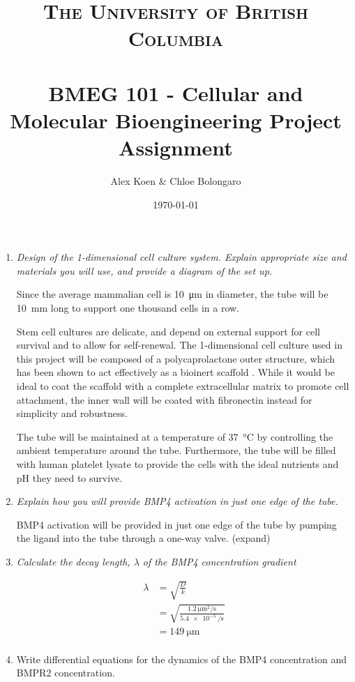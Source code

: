 \documentclass{article} %
\title{
  \normalfont \normalsize
  \textsc{The University of British Columbia} \\ [25pt] %
  \horrule{0.5pt} \\[0.4cm] %
  \huge BMEG 101 - Cellular and Molecular Bioengineering Project Assignment %
  \horrule{2pt} \\[0.5cm] %
}
\author{Alex Koen \& Chloe Bolongaro} %
\date{\normalsize \today} %
\begin{document}
\maketitle %

\onehalfspacing

\begin{enumerate}
\item \textit{Design of the 1-dimensional cell culture system. Explain appropriate size and materials you will use, and provide a diagram of the set up.}

  Since the average mammalian cell is \SI{10}{\micro\m} in diameter, the tube will be \SI{10}{\milli\m} long to support one thousand cells in a row.

  Stem cell cultures are delicate, and depend on external support for cell survival and to allow for self-renewal. The 1-dimensional cell culture used in this project will be composed of a polycaprolactone outer structure, which has been shown to act effectively as a bioinert scaffold \parencite{bertucci2018biomaterial}. While it would be ideal to coat the scaffold with a complete extracellular matrix to promote cell attachment, the inner wall will be coated with fibronectin instead for simplicity and robustness.

  The tube will be maintained at a temperature of \SI{37}{\celsius} by controlling the ambient temperature around the tube. Furthermore, the tube will be filled with human platelet lysate to provide the cells with the ideal nutrients and pH they need to survive.

\item  \textit{Explain how you will provide BMP4 activation in just one edge of the tube.}

BMP4 activation will be provided in just one edge of the tube by pumping the ligand into the tube through a one-way valve. {\color{red}(expand)}
  
\item \textit{Calculate the decay length, $\lambda$ of the BMP4 concentration gradient}
  
  \begin{align*}
    \lambda &= \sqrt{\frac{D}{k}} \\
            &= \sqrt{\frac{\SI{1.2}{\micro\m^2\per\s}}{\SI{5.4e-5}{\per\s}}} \\
            &= \SI{149}{\micro\m} \\
  \end{align*}
\item Write differential equations for the dynamics of the BMP4 concentration and BMPR2 concentration.


\end{enumerate}
\end{document}
